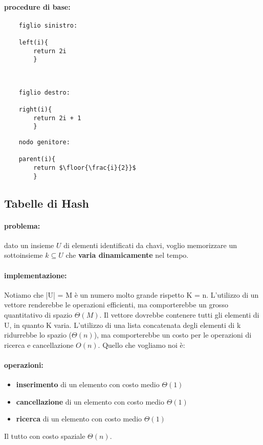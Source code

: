 \documentclass{article}
\DeclarePairedDelimiter\floor{\lfloor}{\rfloor}
\begin{document}
\paragraph{procedure di base:}

\begin{tabbing}
\begin{lstlisting}
    figlio sinistro:

    left(i){
        return 2i
        } 
\end{lstlisting}
\
\begin{lstlisting}
    figlio destro:

    right(i){
        return 2i + 1
        }
\end{lstlisting}
\begin{lstlisting}
    nodo genitore:

    parent(i){
        return $\floor{\frac{i}{2}}$
        }
\end{lstlisting}
    
\end{tabbing}

\subsection{Tabelle di Hash} %
\paragraph{problema:} dato un insieme $U$ di elementi identificati da chavi, voglio memorizzare un sottoinsieme $k \subseteq U$ che \textbf{varia dinamicamente} nel tempo.
\paragraph{implementazione:}Notiamo che |U| = M è un numero molto grande rispetto K = n. L'utilizzo di un vettore renderebbe le operazioni efficienti, ma comporterebbe un grosso quantitativo di spazio $\Theta(M)$. Il vettore dovrebbe 
contenere tutti gli elementi di U, in quanto K varia. L'utilizzo 
di una lista concatenata degli elementi di k ridurrebbe lo spazio ($\Theta(n)$), ma comporterebbe un costo per le operazioni di ricerca e cancellazione $O(n)$. Quello che vogliamo noi è:
\paragraph{operazioni:}
\begin{itemize}
    \item \textbf{inserimento} di un elemento con costo medio $\Theta(1)$
    \item \textbf{cancellazione} di un elemento con costo medio $\Theta(1)$
    \item \textbf{ricerca} di un elemento con costo medio $\Theta(1)$
\end{itemize}
Il tutto con costo spaziale $\Theta(n)$.
\end{document}
